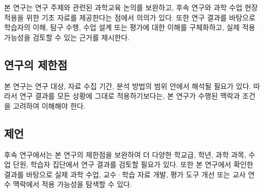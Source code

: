 본 연구는 연구 주제와 관련된 과학교육 논의를 보완하고, 후속 연구와 과학 수업 현장 적용을 위한 기초 자료를 제공한다는 점에서 의의가 있다.
또한 연구 결과를 바탕으로 학습자의 이해, 탐구 수행, 수업 설계 또는 평가에 대한 이해를 구체화하고, 실제 적용 가능성을 검토할 수 있는 근거를 제시한다.

\subsection{연구의 제한점}


본 연구는 연구 대상, 자료 수집 기간, 분석 방법의 범위 안에서 해석될 필요가 있다.
따라서 연구 결과를 모든 상황에 그대로 적용하기보다는, 본 연구가 수행된 맥락과 조건을 고려하여 이해해야 한다.

\subsection{제언}


후속 연구에서는 본 연구의 제한점을 보완하여 더 다양한 학교급, 학년, 과학 과목, 수업 단원, 학습자 집단에서 연구 결과를 검토할 필요가 있다.
또한 본 연구에서 확인한 결과를 바탕으로 실제 과학 수업, 교수·학습 자료 개발, 평가 도구 개선 또는 교사 연수 맥락에서 적용 가능성을 탐색할 수 있다.
